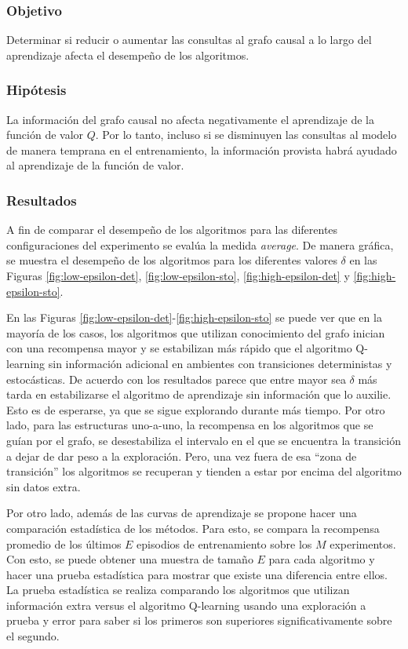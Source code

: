 \subsubsection{Objetivo}

Determinar si reducir o aumentar las consultas al grafo causal a lo largo del aprendizaje afecta el desempeño
de los algoritmos.

\subsubsection{Hipótesis}

La información del grafo causal no afecta negativamente 
el aprendizaje de la función de valor $Q$. Por lo tanto, incluso si se disminuyen las consultas al modelo de manera temprana en el entrenamiento, la información provista habrá
ayudado al aprendizaje de la función de valor.

\subsubsection{Resultados}

A fin de  comparar el desempeño de los algoritmos
para las diferentes configuraciones del experimento
se evalúa la medida \textit{average}.
De manera gráfica, se muestra el desempeño de los algoritmos
para los diferentes valores $\delta$ en las Figuras \ref{fig:low-epsilon-det}, \ref{fig:low-epsilon-sto}, \ref{fig:high-epsilon-det} y \ref{fig:high-epsilon-sto}.

En las Figuras \ref{fig:low-epsilon-det}-\ref{fig:high-epsilon-sto} se puede ver que en la mayoría de los casos, los algoritmos que utilizan conocimiento del grafo inician con una recompensa mayor y se estabilizan más rápido que el algoritmo Q-learning
sin información adicional en ambientes con transiciones deterministas y estocásticas.
De acuerdo con los resultados parece que 
entre mayor sea $\delta$ más tarda en estabilizarse
el algoritmo de aprendizaje sin información que lo auxilie. Esto es de esperarse, ya que se sigue explorando durante más tiempo. 
Por otro lado, para las estructuras uno-a-uno, la recompensa en los algoritmos que se guían por el grafo, se desestabiliza el intervalo en el que se encuentra la transición a dejar de dar peso a
la exploración. Pero, una vez fuera de esa ``zona de transición'' los
algoritmos se recuperan y tienden a estar por encima del algoritmo sin datos 
extra.

Por otro lado, además de las curvas de aprendizaje se propone hacer una comparación estadística de
los métodos. Para esto, se
compara la recompensa promedio de los últimos $E$ episodios
de entrenamiento sobre los $M$ experimentos. Con esto, se 
puede obtener una muestra de tamaño $E$ para cada algoritmo
y hacer una prueba estadística para mostrar que existe una diferencia entre ellos. La prueba estadística se realiza comparando los algoritmos que utilizan información extra versus el algoritmo Q-learning usando una exploración a prueba y error para saber si los primeros son superiores significativamente sobre el segundo. 

